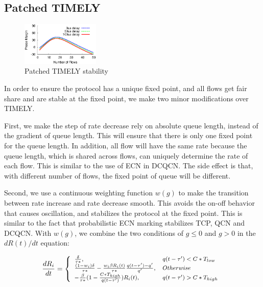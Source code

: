\subsection {Patched TIMELY}

\begin{figure}[t]
\center
\includegraphics[width=0.33\textwidth]{figures/timely_stability.eps}
\caption{Patched TIMELY stability}
\label{fig:timely_stability}
\end{figure}


In order to ensure the protocol has a unique fixed point, and all flows get fair share and are stable at the fixed point,
we make two minor modifications over TIMELY.

First, we make the step of rate decrease rely on absolute queue length, instead of the gradient of queue length. 
This will ensure that there is only one fixed point for the queue length. In addition, all flow will have the same rate 
because the queue length, which is shared across flows, can uniquely determine the rate of each flow. This is 
similar to the use of ECN in DCQCN. The side effect is that, with different number of flows, the fixed point of 
queue will be different.

Second, we use a continuous weighting function $w(g)$ to make the transition between rate increase and rate decrease
smooth. This avoids the on-off behavior that causes oscillation, and stabilizes the protocol at the fixed point. 
This is similar to the fact that probabilistic ECN marking stabilizes TCP, QCN and DCQCN. With $w(g)$, we combine 
the two conditions of $g \le 0$ and $g>0$ in the $dR(t)/dt$ equation:


\begin{equation}
\small
\frac{{dR_i}}{{dt}} = \left\{ \begin{array}{ll}
\frac{\delta }{{\tau *}}, & q(t - \tau ') < C*{T_{low}}\\
\frac{{(1 - {w_i})\delta }}{{\tau *}} - \frac{{{w_i}\beta {R_i}(t)}}{{\tau *}}\frac{{q(t - \tau ') - q'}}{{q'}}, & Otherwise\\
 - \frac{\beta }{{\tau *}}(1 - \frac{{C*{T_{high}}}}{{q(t - \tau ')}})R_i(t), & q(t - \tau ') > C*{T_{high}}
\end{array} \right.\\
\label{eq:timely_fixed}
\end{equation}

